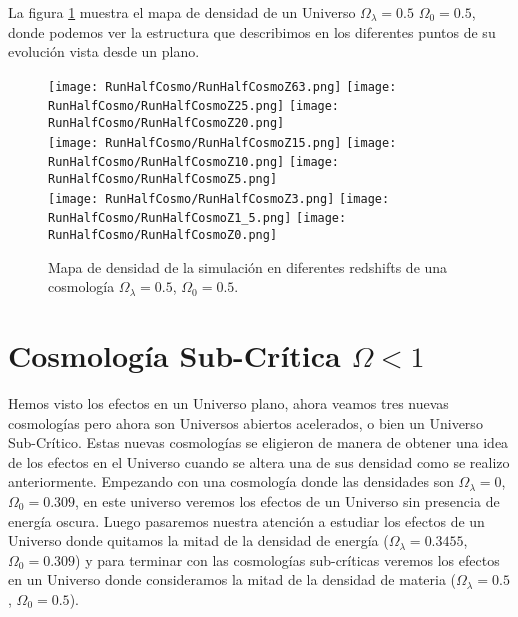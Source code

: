 La figura \ref{fig:HalfCosmo-DensityMap} muestra el mapa de densidad de un Universo $\Omega_\lambda = 0.5 $ $\Omega_0 = 0.5$, donde podemos ver la estructura que describimos en los diferentes puntos de su evolución vista desde un plano.
\begin{figure}[H]
    \centering

    \texttt{[image: RunHalfCosmo/RunHalfCosmoZ63.png]}   %
    \texttt{[image: RunHalfCosmo/RunHalfCosmoZ25.png]}   %
    \texttt{[image: RunHalfCosmo/RunHalfCosmoZ20.png]}   %
    \\
    \texttt{[image: RunHalfCosmo/RunHalfCosmoZ15.png]}   %
    \texttt{[image: RunHalfCosmo/RunHalfCosmoZ10.png]}   %
    \texttt{[image: RunHalfCosmo/RunHalfCosmoZ5.png]}    %
    \\
    \texttt{[image: RunHalfCosmo/RunHalfCosmoZ3.png]}    %
    \texttt{[image: RunHalfCosmo/RunHalfCosmoZ1\_5.png]}  %
    \texttt{[image: RunHalfCosmo/RunHalfCosmoZ0.png]}    %
    \caption[Mapa de densidad en en diferentes redshift]{ \footnotesize Mapa de densidad de la simulación en diferentes redshifts de una cosmología $\Omega_\lambda = 0.5$, $\Omega_0 = 0.5$. }
    \label{fig:HalfCosmo-DensityMap}
\end{figure}

\section[Cosmología Sub-Crítica \texorpdfstring{$\Omega < 1$}{Omega < 1}]{Cosmología Sub-Crítica \texorpdfstring{$\Omega < 1$}{Omega < 1}}

\noindent Hemos visto los efectos en un Universo plano, ahora veamos tres nuevas cosmologías pero ahora son Universos abiertos acelerados, o bien un Universo Sub-Crítico. Estas nuevas cosmologías se eligieron de manera de obtener una idea de los efectos en el Universo cuando se altera una de sus densidad como se realizo anteriormente. Empezando con una cosmología donde las densidades son $\Omega_\lambda = 0$, $\Omega_0 = 0.309$, en este universo veremos los efectos de un Universo sin presencia de energía oscura. Luego pasaremos nuestra atención a estudiar los efectos de un Universo donde quitamos la mitad de la densidad de energía ($\Omega_\lambda = 0.3455$, $\Omega_0 = 0.309$) y para terminar con las cosmologías sub-críticas veremos los efectos en un Universo donde consideramos la mitad de la densidad de materia ($\Omega_\lambda = 0.5$, $\Omega_0 = 0.5$).

